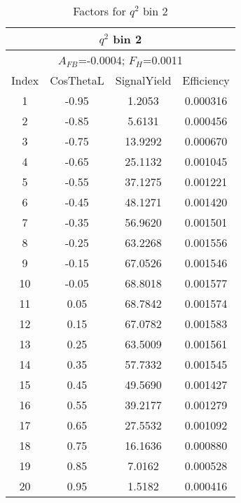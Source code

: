 \begin{table*}[htbH]
  \begin{center}
  \caption{Factors for $q^2$ bin 2 
  \label{tab:factors_bin2}}
  \small
  \begin{tabular}{|c||c|c|c|}
    \hline
    \multicolumn{4}{|c|}{$q^2$ bin 2} \\ 
    \hline
    \multicolumn{4}{|c|}{$A_{FB}$=-0.0004;   $F_{H}$=0.0011} \\ 
    \hline
    Index & CosThetaL & SignalYield & Efficiency \\ 
    \hline
    1 & -0.95 & 1.2053 & 0.000316 \\ 
    2 & -0.85 & 5.6131 & 0.000456 \\ 
    3 & -0.75 & 13.9292 & 0.000670 \\ 
    4 & -0.65 & 25.1132 & 0.001045 \\ 
    5 & -0.55 & 37.1275 & 0.001221 \\ 
    6 & -0.45 & 48.1271 & 0.001420 \\ 
    7 & -0.35 & 56.9620 & 0.001501 \\ 
    8 & -0.25 & 63.2268 & 0.001556 \\ 
    9 & -0.15 & 67.0526 & 0.001546 \\ 
    10 & -0.05 & 68.8018 & 0.001577 \\ 
    11 & 0.05 & 68.7842 & 0.001574 \\ 
    12 & 0.15 & 67.0782 & 0.001583 \\ 
    13 & 0.25 & 63.5009 & 0.001561 \\ 
    14 & 0.35 & 57.7332 & 0.001545 \\ 
    15 & 0.45 & 49.5690 & 0.001427 \\ 
    16 & 0.55 & 39.2177 & 0.001279 \\ 
    17 & 0.65 & 27.5532 & 0.001092 \\ 
    18 & 0.75 & 16.1636 & 0.000880 \\ 
    19 & 0.85 & 7.0162 & 0.000528 \\ 
    20 & 0.95 & 1.5182 & 0.000416 \\ 
    \hline
  \end{tabular}
  \end{center}
\end{table*}


